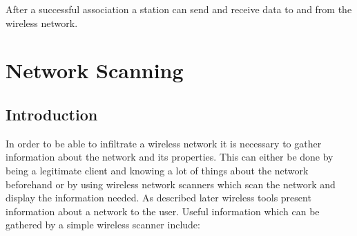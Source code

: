 After a successful association a station can send and receive data to and from the wireless network.


\chapter{Network Scanning}

\section{Introduction}

In order to be able to infiltrate a wireless network it is necessary to gather information about the network and its properties. This can either be done by being a legitimate client and knowing a lot of things about the network beforehand or by using wireless network scanners which scan the network and display the information needed. As described later wireless tools present information about a network to the user. Useful information which can be gathered by a simple wireless scanner include:

